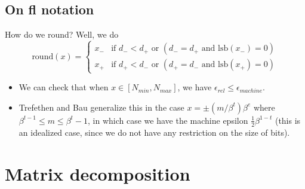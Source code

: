 \documentclass[11pt,reqno]{amsart}
\theoremstyle{remark}
\begin{document}
\subsection{On fl notation}
How do we round? Well, we do
\[
\text{round}(x)=
\begin{cases} 
x_- & \text{if } d_- < d_+ \text{ or } (d_- = d_+ \text{ and } \text{lsb}(x_-) = 0) \\
x_+ & \text{if } d_+ < d_- \text{ or } (d_+ = d_- \text{ and } \text{lsb}(x_+) = 0)
\end{cases}
\]
\begin{itemize}
\item We can check that when $x\in [N_{min}, N_{max}]$, we have $\epsilon_{rel}\leq \epsilon_{machine}$.
\item Trefethen and Bau generalize this in the case $x=\pm (m/\beta^t)\beta^e$ where $\beta^{t-1}\leq m\leq \beta^t-1$, in which case we have the machine epsilon $\frac 12\beta^{1-t}$ (this is an idealized
 case, since we do not have any restriction on the size of bits).
\end{itemize}
\section{Matrix decomposition}
\end{document}
